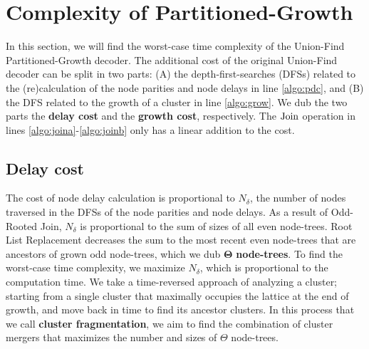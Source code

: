 
\section{Complexity of Partitioned-Growth}\label{sec:complexity}

In this section, we will find the worst-case time complexity of the Union-Find Partitioned-Growth decoder. The additional cost of the original Union-Find decoder can be split in two parts: (A) the depth-first-searches (DFSs) related to the (re)calculation of the node parities and node delays in line \ref{algo:pdc}, and (B) the DFS related to the growth of a cluster in line \ref{algo:grow}. We dub the two parts the \textbf{delay cost} and the \textbf{growth cost}, respectively. The $\operatorname{Join}$ operation in lines \ref{algo:joina}-\ref{algo:joinb} only has a linear addition to the cost.

\subsection{Delay cost}\label{sec:suscomplexity}

The cost of node delay calculation is proportional to $N_\delta$, the number of nodes traversed in the DFSs of the node parities and node delays. As a result of Odd-Rooted Join, $N_\delta$ is proportional to the sum of sizes of all even node-trees. Root List Replacement decreases the sum to the most recent even node-trees that are ancestors of grown odd node-trees, which we dub $\mathbf{\Theta}$ \textbf{node-trees}. To find the worst-case time complexity, we maximize $N_\delta$, which is proportional to the computation time. We take a time-reversed approach of analyzing a cluster; starting from a single cluster that maximally occupies the lattice at the end of growth, and move back in time to find its ancestor clusters. In this process that we call \textbf{cluster fragmentation}, we aim to find the combination of cluster mergers that maximizes the number and sizes of $\Theta$ node-trees. 





